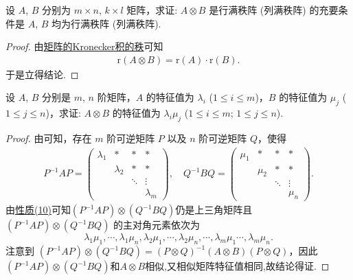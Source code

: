 \documentclass[../../main.tex]{subfiles}%
\begin{document}
\begin{corollary}\label{corollary:矩阵的Kronecker积关于行列满秩阵的推论}
设 $A$, $B$ 分别为 $m\times n$, $k\times l$ 矩阵，求证: $A\otimes B$ 是行满秩阵 (列满秩阵) 的充要条件是 $A$, $B$ 均为行满秩阵 (列满秩阵). 
\end{corollary}
\begin{proof}

由\hyperref[proposition:矩阵的Kronecker积的秩]{矩阵的Kronecker积的秩}可知
\begin{align*}
\mathrm{r}\left( A\otimes B \right) =\mathrm{r}\left( A \right) \cdot \mathrm{r}\left( B \right) .
\end{align*}
于是立得结论.

\end{proof}

\begin{proposition}[矩阵的Kronecker积的特征值]\label{proposition:矩阵的Kronecker积的特征值}
设 $A$, $B$ 分别是 $m$, $n$ 阶矩阵，$A$ 的特征值为 $\lambda_i$ ($1\leqslant  i\leqslant  m$)，$B$ 的特征值为 $\mu_j$ ($1\leqslant  j\leqslant  n$)，求证: $A\otimes B$ 的特征值为 $\lambda_i\mu_j$ ($1\leqslant  i\leqslant  m$; $1\leqslant  j\leqslant  n$).
\end{proposition}
\begin{proof}

由可知，存在 $m$ 阶可逆矩阵 $P$ 以及 $n$ 阶可逆矩阵 $Q$，使得
\begin{align*}
P^{-1}AP = 
\begin{pmatrix}
\lambda_1 & * & * & * \\
& \lambda_2 & * & * \\
& & \ddots & \vdots \\
& & & \lambda_m
\end{pmatrix}, \quad 
Q^{-1}BQ = 
\begin{pmatrix}
\mu_1 & * & * & * \\
& \mu_2 & * & * \\
& & \ddots & \vdots \\
& & & \mu_n
\end{pmatrix}.
\end{align*}
由\hyperref[矩阵的Kronecker积的基本性质(10)]{性质(10)}可知$(P^{-1}AP)\otimes (Q^{-1}BQ)$仍是上三角矩阵且 $(P^{-1}AP)\otimes (Q^{-1}BQ)$ 的主对角元素依次为
\[
\lambda_1\mu_1,\cdots,\lambda_1\mu_n,\lambda_2\mu_1,\cdots,\lambda_2\mu_n,\cdots,\lambda_m\mu_1\cdots,\lambda_m\mu_n.
\]
注意到 $(P^{-1}AP)\otimes (Q^{-1}BQ)=(P\otimes Q)^{-1}(A\otimes B)(P\otimes Q)$，因此$(P^{-1}AP)\otimes (Q^{-1}BQ)$和$A\otimes B$相似,又相似矩阵特征值相同,故结论得证.

\end{proof}
\end{document}
